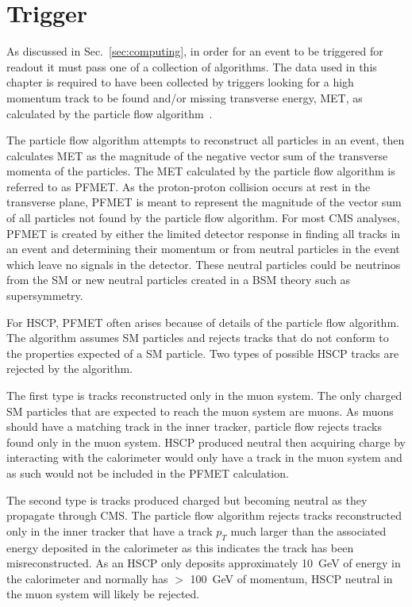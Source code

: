 \section{Trigger \label{sec:trigger}}
As discussed in Sec.~\ref{sec:computing}, in order for an event to be triggered for readout it must pass one of a collection of algorithms.
The data used in this chapter is required to have been collected by triggers looking for a high momentum track to be found
and/or missing transverse energy, MET, as calculated by the particle flow algorithm~\cite{Chatrchyan:2011tn}. 

The particle flow algorithm attempts
to reconstruct all particles in an event, then calculates MET as the magnitude of the negative vector sum of the transverse momenta of the particles. 
The MET calculated by the particle flow algorithm is referred to as PFMET.
As the proton-proton collision occurs
at rest in the transverse plane, PFMET is meant to represent the magnitude of the vector sum of all particles not found by the particle flow algorithm.
For most CMS analyses, PFMET is created
by either the limited detector response in finding all tracks in an event and determining their momentum or from neutral particles in the event which leave no signals
in the detector. These neutral particles could be neutrinos from the SM or new neutral particles created in a BSM theory such as supersymmetry. 

For HSCP, PFMET often arises because of details of the particle flow algorithm. The algorithm assumes SM particles and rejects tracks that do not conform to the properties expected
of a SM particle. Two types of possible HSCP tracks are rejected by the algorithm. 

The first type is tracks reconstructed only in the muon system. The only charged SM particles that
are expected to reach the muon system are muons. As muons should have a matching track in the inner tracker, particle flow rejects tracks found only in the
muon system. HSCP produced neutral then acquiring charge by interacting with the calorimeter
would only have a track in the muon system and as such would not be included in the PFMET calculation. 

The second type is tracks produced charged but becoming neutral as they propagate through CMS.
The particle flow algorithm rejects tracks reconstructed only in the inner tracker that have a track $p_T$ much larger
than the associated energy deposited in the calorimeter as this indicates the track has been misreconstructed.
As an HSCP only deposits approximately 10~GeV of energy in the calorimeter and normally has $>$ 100~GeV of momentum, HSCP neutral in the muon system will likely be rejected. 

